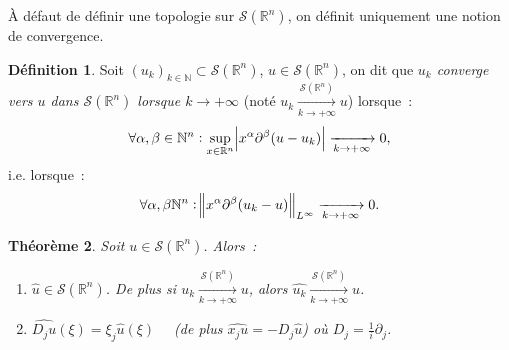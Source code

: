 \documentclass{report}
\newcommand{\R}{{\mathbb R}}
\newcommand{\N}{{\mathbb N}}
\newcommand{\pinfty}{{+\infty}}
\newtheorem{thm}{Théorème}[chapter]
\theoremstyle{definition}
\newtheorem{déf}[thm]{Définition}
\theoremstyle{remark}
\begin{document}
À défaut de définir une topologie sur $\mathcal S(\R^n)$, on définit uniquement une notion de convergence.

\begin{déf}\label{déf:convergence Schwartz} Soit $(u_k)_{k \in \N} \subset \mathcal S(\R^n)$, $u \in \mathcal S(\R^n)$, on dit que \textit{$u_k$ converge vers $u$ dans
$\mathcal S(\R^n)$ lorsque $k \to \pinfty$} (noté $u_k \xrightarrow[k \to \pinfty]{\mathcal S(\R^n)} u$) lorsque~:
\[\forall \alpha, \beta \in \N^n : \sup_{x \in \R^n}\abs {x^\alpha\partial^\beta(u-u_k)} \xrightarrow[k \to \pinfty]{} 0,\]
i.e. lorsque~:
\[\forall \alpha, \beta \N^n : \norm {x^\alpha\partial^\beta(u_k-u)}_{L^\infty} \xrightarrow[k \to \pinfty]{} 0.\]
\end{déf}

\begin{thm}\label{thm:Fourier continu sur Schwartz} Soit $u \in \mathcal S(\R^n)$. Alors~:
\begin{enumerate}
	\item $\hat u \in \mathcal S(\R^n)$. De plus si $u_k \xrightarrow[k \to \pinfty]{\mathcal S(\R^n)} u$, alors $\hat {u_k} \xrightarrow[k \to \pinfty]{\mathcal S(\R^n)} \hat u$.
	\item $\widehat {D_ju}(\xi) = \xi_j\hat u(\xi)\quad$ (de plus $\widehat {x_ju} = -D_j \hat u$) où $D_j = \frac 1i\partial_j$.
\end{enumerate}
\end{thm}
\end{document}
